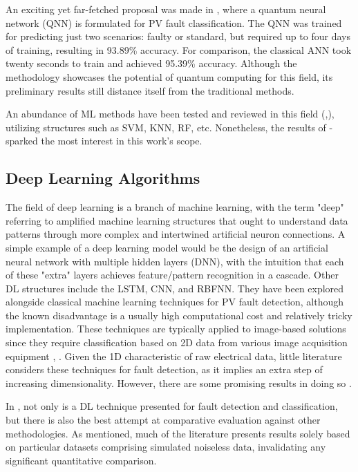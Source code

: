An exciting yet far-fetched proposal was made in \cite{Uehara2021}, where a quantum neural network (QNN) is formulated for PV fault classification. The QNN was trained for predicting just two scenarios: faulty or standard, but required up to four days of training, resulting in 93.89\% accuracy. For comparison, the classical ANN took twenty seconds to train and achieved 95.39\% accuracy. Although the methodology showcases the potential of quantum computing for this field, its preliminary results still distance itself from the traditional methods.

An abundance of ML methods have been tested and reviewed in this field (\cite{Hong2022},\cite{Livera2019}), utilizing structures such as SVM, KNN, RF, etc. Nonetheless, the results of \cite{Rao2021}-\cite{Kilic2020} sparked the most interest in this work's scope.

\subsection{Deep Learning Algorithms}

The field of deep learning is a branch of machine learning, with the term "deep" referring to amplified machine learning structures that ought to understand data patterns through more complex and intertwined artificial neuron connections. A simple example of a deep learning model would be the design of an artificial neural network with multiple hidden layers (DNN), with the intuition that each of these "extra" layers achieves feature/pattern recognition in a cascade. Other DL structures include the LSTM, CNN, and RBFNN. They have been explored alongside classical machine learning techniques for PV fault detection, although the known disadvantage is a usually high computational cost and relatively tricky implementation. These techniques are typically applied to image-based solutions \cite{termoreview} since they require classification based on 2D data from various image acquisition equipment \cite{termo}, \cite{dlpv}. Given the 1D characteristic of raw electrical data, little literature considers these techniques for fault detection, as it implies an extra step of increasing dimensionality. However, there are some promising results in doing so \cite{Aziz2020}.

In \cite{Aziz2020}, not only is a DL technique presented for fault detection and classification, but there is also the best attempt at comparative evaluation against other methodologies. As mentioned, much of the literature presents results solely based on particular datasets comprising simulated noiseless data, invalidating any significant quantitative comparison.

